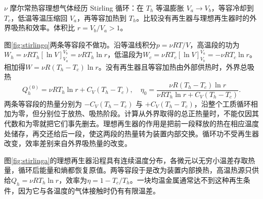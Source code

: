 \begin{example}[再生器怎样改变循环效率]
$\nu$ 摩尔常热容理想气体经历 Stirling 循环：在 $T_h$ 等温膨胀 $V_a\to V_b$，等容冷却到 $T_c$，低温等温压缩回 $V_a$，再等容加热到 $T_h$。比较没有再生器与理想再生器时的外界吸热和效率。体积比 $r=V_b/V_a>1$。
\end{example}
\begin{solution}
图\ref{fig:stirlingq}两条等容段不做功。沿等温线积分$p=\nu RT/V$，高温段的功为$W_h=\nu RT_h[\ln V]_{V_a}^{V_b}=\nu RT_h\ln r$，低温段为$W_c=\nu RT_c[\ln V]_{V_b}^{V_a}=-\nu RT_c\ln r$。相加得$W=\nu R(T_h-T_c)\ln r$。没有再生器且等容加热由外部供热时，外界总吸热
\[
 Q_h^{(0)}=\nu RT_h\ln r+C_V(T_h-T_c),
 \quad \eta_0=\frac{\nu R(T_h-T_c)\ln r}{\nu RT_h\ln r+C_V(T_h-T_c)}.
\]
两条等容段的热量分别为 $-C_V(T_h-T_c)$ 与 $+C_V(T_h-T_c)$，沿整个工质循环相加为零，但分别位于放热、吸热阶段。计算从外界取得的总正热量时，不能仅因其代数和为零就把它们事先删去。理想再生器的作用是把前一段释放的热在相应温度处储存，再交还给后一段，使这两段的热量转为装置内部交换。循环功不受再生器改变，效率差别来自外界吸热量的改变。

图\ref{fig:stirlinga}的理想再生器沿程具有连续温度分布，各微元以无穷小温差存取热量，循环后能量和熵都恢复原值。两等容段于是改为装置内部换热，高温热源只供给$Q_h=\nu RT_h\ln r$，效率为$\eta=1-T_c/T_h$。一块均温金属通常达不到这种再生条件，因为它与各温度的气体接触时仍有有限温差。
\end{solution}

